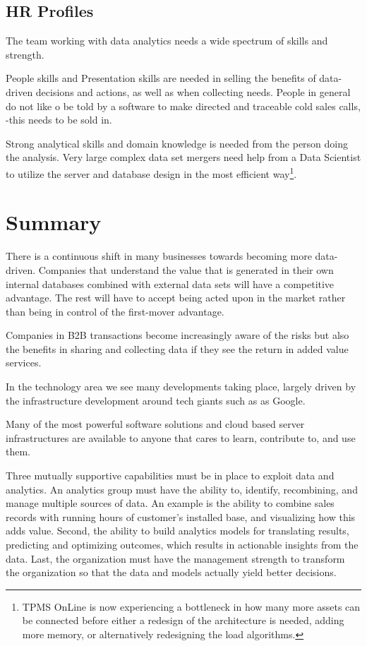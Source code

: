 \documentclass[10pt]{article} %
\begin{document}
\subsection{HR Profiles}

The team working with data analytics needs a wide spectrum of skills and strength. 

People skills and Presentation skills are needed in selling the benefits of data-driven decisions and actions, as well as when collecting needs. People in general do not like o be told by a software to make directed and traceable cold sales calls, -this needs to be sold in.

Strong analytical skills and domain knowledge is needed from the person doing the analysis. Very large complex data set mergers need help from a Data Scientist to utilize the server and database design in the most efficient way\footnote{TPMS OnLine is now experiencing a bottleneck in how many more assets can be connected before either a redesign of the architecture is needed, adding more memory, or alternatively redesigning the load algorithms.}.


\section{Summary}

There is a continuous shift in many businesses towards becoming more data-driven. Companies that understand the value that is generated in their own internal databases combined with external data sets will have a competitive advantage. The rest will have to accept being acted upon in the market rather than being in control of the first-mover advantage.

Companies in B2B transactions become increasingly aware of the risks but also the benefits in sharing and collecting data if they see the return in added value services.

In the technology area we see many developments taking place, largely driven by the infrastructure development around tech giants such as as Google.


Many of the most powerful software solutions and cloud based server infrastructures are available to anyone that cares to learn, contribute to, and use them.


Three mutually supportive capabilities must be in place to exploit data and analytics. An analytics group must have the ability to, identify, recombining, and manage multiple sources of data. An example is the ability to combine sales records with running hours of customer's installed base, and visualizing how this adds value. Second, the ability to build analytics models for translating results, predicting and optimizing outcomes, which results in actionable insights from the data. Last, the organization must have the management strength to transform the organization so that the data and models actually yield better decisions.
\end{document}
